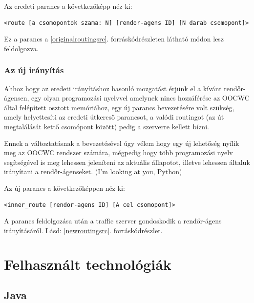 \documentclass[a4paper,12pt]{report}
\begin{document}
\vspace{2mm}
Az eredeti parancs a következőképp néz ki: 
\begin{lstlisting}
<route [a csomopontok szama: N] [rendor-agens ID] [N darab csomopont]>
\end{lstlisting}

Ez a parancs a \ref{originalroutingsrc}. forráskódrészleten látható módon lesz feldolgozva.



\subsection{Az új irányítás}
\label{newrouting}

Ahhoz hogy az eredeti irányításhoz hasonló mozgatást érjünk el a kívánt rendőr-ágensen, egy olyan programozási nyelvvel amelynek nincs hozzáférése az OOCWC által felépített osztott memóriához, egy új parancs bevezetésére volt szükség, amely helyettesíti az eredeti útkereső parancsot, a valódi routingot (az út megtalálását kettő csomópont között) pedig a szerverre kellett bízni.

\vspace{2mm}
Ennek a változtatásnak a bevezetésével úgy vélem hogy egy új lehetőség nyílik meg az OOCWC rendszer számára, mégpedig hogy több programozási nyelv segítségével is meg lehessen jeleníteni az aktuális állapotot, illetve lehessen általuk irányítani a rendőr-ágenseket. (I'm looking at you, Python)

\vspace{2mm}
Az új parancs a következőképpen néz ki:
\begin{lstlisting}
<inner_route [rendor-agens ID] [A cel csomopont]>
\end{lstlisting}

A parancs feldolgozása után a traffic szerver gondoskodik a rendőr-ágens irányításáról. Lásd: \ref{newroutingsrc}. forráskódrészlet.



\newpage
\chapter{Felhasznált technológiák}
\label{technologies}

\section{Java}
\label{java}
\end{document}
